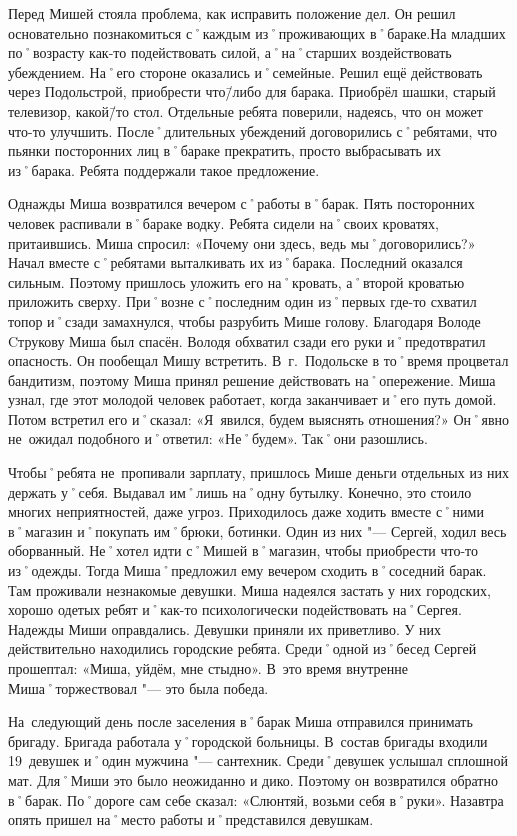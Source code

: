 Перед Мишей стояла проблема, как исправить положение дел. Он решил основательно познакомиться с˚каждым из˚проживающих в˚бараке.На младших по˚возрасту как-то подействовать силой, а˚на˚старших воздействовать убеждением. На˚его стороне оказались и˚семейные. Решил ещё действовать через Подольстрой, приобрести что\=/либо для барака. Приобрёл шашки, старый телевизор, какой\=/то стол. Отдельные ребята поверили, надеясь, что он может что-то улучшить. После˚длительных убеждений договорились с˚ребятами, что пьянки посторонних лиц в˚бараке прекратить, просто выбрасывать их из˚барака. Ребята поддержали такое предложение.

Однажды Миша возвратился вечером с˚работы в˚барак. Пять посторонних человек распивали в˚бараке водку. Ребята сидели на˚своих кроватях, притаившись. Миша спросил: «Почему они здесь, ведь мы˚договорились?» Начал вместе с˚ребятами выталкивать их из˚барака. Последний оказался сильным. Поэтому пришлось уложить его на˚кровать, а˚второй кроватью приложить сверху. При˚возне с˚последним один из˚первых где-то схватил топор и˚сзади замахнулся, чтобы разрубить Мише голову. Благодаря Володе Cтрукову Миша был спасён. Володя обхватил сзади его руки и˚предотвратил опасность. Он пообещал Мишу встретить. В~г.~Подольске в то˚время процветал бандитизм, поэтому Миша принял решение действовать на˚опережение. Миша узнал, где этот молодой человек работает, когда заканчивает и˚его путь домой. Потом встретил его и˚сказал: «Я~явился, будем выяснять отношения?» Он˚явно не~ожидал подобного и˚ответил: «Не˚будем». Так˚они разошлись.

Чтобы˚ребята не~пропивали зарплату, пришлось Мише деньги отдельных из них держать у˚себя. Выдавал им˚лишь на˚одну бутылку. Конечно, это стоило многих неприятностей, даже угроз. Приходилось даже ходить вместе с˚ними в˚магазин и˚покупать им˚брюки, ботинки. Один из них "--- Сергей, ходил весь оборванный. Не˚хотел идти с˚Мишей в˚магазин, чтобы приобрести что-то из˚одежды. Тогда Миша˚предложил ему вечером сходить в˚соседний барак. Там проживали незнакомые девушки. Миша надеялся застать у них городских, хорошо одетых ребят и˚как-то психологически подействовать на˚Сергея. Надежды Миши оправдались. Девушки приняли их приветливо. У них действительно находились городские ребята. Среди˚одной из˚бесед Сергей прошептал: «Миша, уйдём, мне стыдно». В~это время внутренне Миша˚торжествовал "--- это была победа.

На~следующий день после заселения в˚барак Миша отправился принимать бригаду. Бригада работала у˚городской больницы. В~состав бригады входили 19~девушек и˚один мужчина "--- сантехник. Среди˚девушек услышал сплошной мат. Для˚Миши это было неожиданно и дико. Поэтому он возвратился обратно в˚барак. По˚дороге сам себе сказал: «Слюнтяй, возьми себя в˚руки». Назавтра опять пришел на˚место работы и˚представился девушкам.

